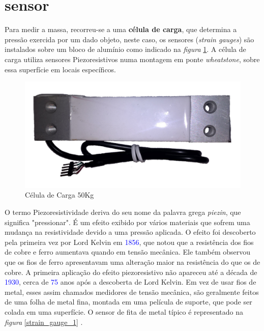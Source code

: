 \section{sensor}
Para medir a massa, recorreu-se a uma \textbf{célula de carga}, que determina a pressão exercida por um dado objeto, neste caso, os sensores (\textit{strain gauges}) são instalados sobre um bloco de alumínio como indicado na \textit{figura} \ref{Load_Cell_1}. A célula de carga utiliza sensores Piezoresistivos numa montagem em ponte \textit{wheatstone}, sobre essa superfície em locais específicos.
\\
\begin{figure}[H]
	\captionsetup{justification=raggedright,singlelinecheck=false}
	\flushleft
	\includegraphics[scale=0.15]{./image/PESTA/material/Load_Cell_1.jpg}
	\caption{Célula de Carga 50Kg}
	\label{Load_Cell_1}
\end{figure}
O termo Piezoresistividade deriva do seu nome da palavra grega \textit{piezin}, que significa "pressionar". É um efeito exibido por vários materiais que sofrem uma mudança na resistividade devido a uma pressão aplicada. O efeito foi descoberto pela primeira vez por Lord Kelvin em \textcolor{blue}{1856}, que notou que a resistência dos fios de cobre e ferro aumentava quando em tensão mecânica. Ele também observou que os fios de ferro apresentavam uma alteração maior na resistência do que os de cobre. A primeira aplicação do efeito piezoresistivo não apareceu até a década de \textcolor{blue}{1930}, cerca de \textcolor{blue}{75} anos após a descoberta de Lord Kelvin. Em vez de usar fios de metal, esses assim chamados medidores de tensão mecânica, são geralmente feitos de uma folha de metal fina, montada em uma película de suporte, que pode ser colada em uma superfície. O sensor de fita de metal típico é representado na \textit{figura} \ref{strain_gauge_1} \cite{book-9}.
\\
